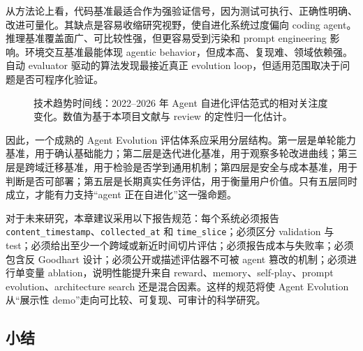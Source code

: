 从方法论上看，代码基准最适合作为强验证信号，因为测试可执行、正确性明确、改进可量化。其缺点是容易收缩研究视野，使自进化系统过度偏向 coding agent。推理基准覆盖面广、可比较性强，但更容易受到污染和 prompt engineering 影响。环境交互基准最能体现 agentic behavior，但成本高、复现难、领域依赖强。自动 evaluator 驱动的算法发现最接近真正 evolution loop，但适用范围取决于问题是否可程序化验证。

\begin{figure}[htbp]
\centering
{}
\caption{技术趋势时间线：2022--2026 年 Agent 自进化评估范式的相对关注度变化。数值为基于本项目文献与 review 的定性归一化估计。}
\label{fig:evaluation-timeline}
\end{figure}

因此，一个成熟的 Agent Evolution 评估体系应采用分层结构。第一层是单轮能力基准，用于确认基础能力；第二层是迭代进化基准，用于观察多轮改进曲线；第三层是跨域迁移基准，用于检验是否学到通用机制；第四层是安全与成本基准，用于判断是否可部署；第五层是长期真实任务评估，用于衡量用户价值。只有五层同时成立，才能有力支持“agent 正在自进化”这一强命题。

对于未来研究，本章建议采用以下报告规范：每个系统必须报告 \texttt{content\_timestamp}、\texttt{collected\_at} 和 \texttt{time\_slice}；必须区分 validation 与 test；必须给出至少一个跨域或新近时间切片评估；必须报告成本与失败率；必须包含反 Goodhart 设计；必须公开或描述评估器不可被 agent 篡改的机制；必须进行单变量 ablation，说明性能提升来自 reward、memory、self-play、prompt evolution、architecture search 还是混合因素。这样的规范将使 Agent Evolution 从“展示性 demo”走向可比较、可复现、可审计的科学研究。

\subsection{小结}

